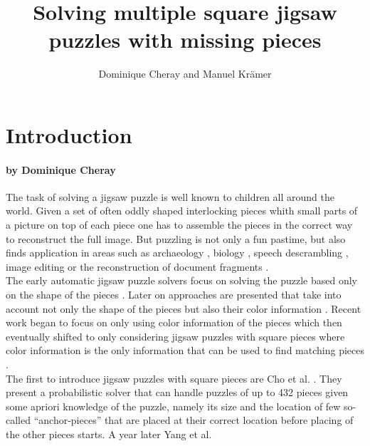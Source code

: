 \documentclass[11pt]{report}
\title{Solving multiple square jigsaw puzzles with missing pieces}
\author{Dominique Cheray and Manuel Krämer}
\begin{document}
\maketitle

\begin{abstract}
\end{abstract}

\tableofcontents

\chapter{Introduction}
\subsubsection*{by Dominique Cheray}
The task of solving a jigsaw puzzle is well known to children all around the
world. Given a set of often oddly shaped interlocking pieces whith small parts
of a picture on top of each piece one has to assemble the pieces in the correct
way to reconstruct the full image. But puzzling is not only a fun pastime, but
also finds application in areas such as archaeology \cite{brown2008system,
  liu2011automated, koller2006computer}, biology \cite{marande2007mitochondrial}, speech
descrambling \cite{zhao2007puzzle}, image editing \cite{cho2008patch} or the
reconstruction of document fragments \cite{zhu2008globally}. \\
The early automatic jigsaw puzzle solvers focus on solving the puzzle based
only on the shape of the pieces \cite{freeman1964apictorial, wolfson1988solving,
webster1990computer, kong2001solving}. Later on approaches are presented that
take into account not only the shape of the pieces but also their color
information \cite{kosiba1994automatic, makridis2006new, sagiroglu2006texture}.
Recent work began to focus on only using color information of the pieces
\cite{nielsen2008solving} which then eventually shifted to only considering jigsaw
puzzles with square pieces where color information is the only information that
can be used to find matching pieces \cite{Cho2010, yang2011particle,
  Pomeranz2011, gallagher2012jigsaw, son2014solving, sholomon2013genetic,
  Paikin2015}. \\
The first to introduce jigsaw puzzles with square pieces are Cho et al.
\cite{Cho2010}. They present a probabilistic solver that can handle puzzles
of up to 432 pieces given some apriori knowledge of the puzzle, namely its size and the
location of few so-called ``anchor-pieces'' that are placed at their correct
location before placing of the other pieces starts. A year later Yang et al.
\end{document}
